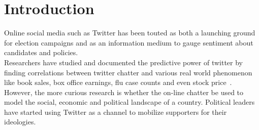 \section{Introduction}
Online social media such as Twitter has been touted as both a launching ground for election campaigns and as an information medium to gauge sentiment about candidates and policies.
\\
Researchers have studied and documented the predictive power of twitter by finding correlations between twitter chatter and various real world phenomenon like book sales, box office earnings, flu case counts and even stock price~\cite{gruhl2005predictive,asur2010predicting,bollen2011twitter}.
However, the more curious research is whether the on-line chatter be used to model the social, economic and political landscape of a country.
Political leaders have started using Twitter as a channel to mobilize supporters for their ideologies.
